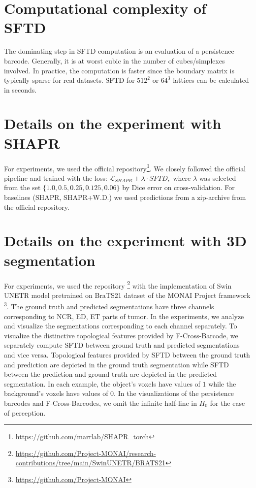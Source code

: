 \documentclass[runningheads]{llncs}
\begin{document}

\section{Computational complexity of SFTD}
\label{app:complexity}

The dominating step in SFTD computation is an evaluation of a persistence barcode.
Generally, it is at worst cubic in the number of cubes/simplexes involved. In practice, the computation is faster since the boundary matrix is typically sparse for real datasets. 
SFTD for $512^2$ or $64^3$ lattices can be calculated in seconds.

\section{Details on the experiment with SHAPR}

For experiments, we used the official repository\footnote{\url{https://github.com/marrlab/SHAPR_torch}}. We closely followed the official pipeline and trained with the loss:
$
\mathcal{L}_{SHAPR} + \lambda \cdot SFTD,$
where $\lambda$ was selected from the set $\{1.0, 0.5, 0.25, 0.125, 0.06\}$ by Dice error on cross-validation.
For baselines (SHAPR, SHAPR+W.D.) we used predictions from a zip-archive from the official repository.

\section{Details on the experiment with 3D segmentation}

For experiments, we used the repository \footnote{\url{https://github.com/Project-MONAI/research-contributions/tree/main/SwinUNETR/BRATS21}} with the implementation of Swin UNETR model pretrained on BraTS21 dataset of the MONAI Project framework \footnote{\url{https://github.com/Project-MONAI}}. The ground truth and predicted segmentations have three channels corresponding to NCR, ED, ET parts of tumor. In the experiments, we analyze and visualize the segmentations corresponding to each channel separately. To visualize the distinctive topological features provided by F-Cross-Barcode, we separately compute SFTD between ground truth and predicted segmentations and vice versa. Topological features provided by SFTD between the ground truth and prediction are depicted in the ground truth segmentation while SFTD between the prediction and ground truth are depicted in the predicted segmentation. In each example, the object's voxels have values of $1$ while the background's voxels have values of $0$. In the visualizations of the persistence barcodes and F-Cross-Barcodes, we omit the infinite half-line in $H_0$ for the ease of perception.
\end{document}
